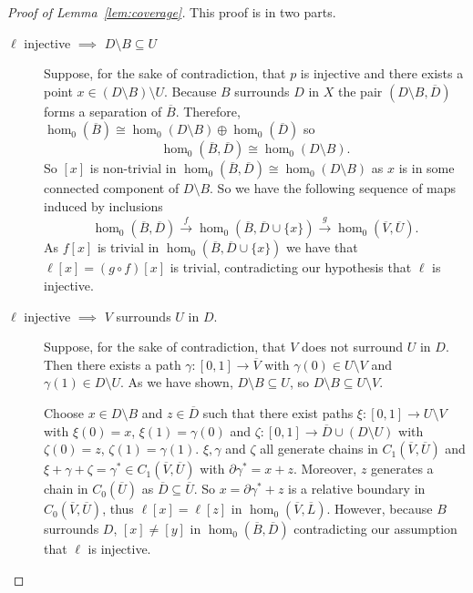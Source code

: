 
\begin{proof}[Proof of Lemma~\ref{lem:coverage}]
  This proof is in two parts.
  \begin{description}
    \item[$\ell$ injective $\implies$ $D\setminus B\subseteq U$] Suppose, for the sake of contradiction, that $p$ is injective and there exists a point $x\in (D\setminus B)\setminus U$.
      Because $B$ surrounds $D$ in $X$ the pair $(D\setminus B, \overline{D})$ forms a separation of $\overline{B}$.
      Therefore, $\hom_0(\overline{B})\cong \hom_0(D\setminus B)\oplus \hom_0(\overline{D})$ so
      \[ \hom_0(\overline{B}, \overline{D})\cong \hom_0(D\setminus B). \]
      So $[x]$ is non-trivial in $\hom_0(\overline{B},\overline{D})\cong \hom_0(D\setminus B)$ as $x$ is in some connected component of $D\setminus B$.
      So we have the following sequence of maps induced by inclusions
      \[ \hom_0(\overline{B},\overline{D})\xrightarrow{f} \hom_0(\overline{B},\overline{D}\cup\{x\})\xrightarrow{g} \hom_0(\overline{V},\overline{U}).\]
      As $f[x]$ is trivial in $\hom_0(\overline{B},\overline{D}\cup\{x\})$ we have that $\ell[x] = (g\circ f)[x]$ is trivial, contradicting our hypothesis that $\ell$ is injective.
    \item[$\ell$ injective $\implies$ $V$ surrounds $U$ in $D$.] Suppose, for the sake of contradiction, that $V$ does not surround $U$ in $D$.
      Then there exists a path $\gamma : [0,1]\to\overline{V}$ with $\gamma(0)\in U\setminus V$ and $\gamma(1)\in D\setminus U$.
      As we have shown, $D\setminus B\subseteq U$, so $D\setminus B\subseteq U\setminus V$.

      Choose $x\in D\setminus B$ and $z\in \overline{D}$ such that there exist paths $\xi : [0,1]\to U\setminus V$ with $\xi(0) = x$, $\xi(1) = \gamma(0)$ and $\zeta : [0,1]\to \overline{D}\cup (D\setminus U)$ with $\zeta(0) = z$, $\zeta(1) = \gamma(1)$.
      $\xi, \gamma$ and $\zeta$ all generate chains in $C_1(\overline{V}, \overline{U})$ and $\xi + \gamma + \zeta = \gamma^*\in C_1(\overline{V}, \overline{U})$ with $\partial\gamma^* = x + z$.
      Moreover, $z$ generates a chain in $C_0(\overline{U})$ as $\overline{D}\subseteq\overline{U}$.
      So $x = \partial\gamma^* + z$ is a relative boundary in $C_0(\overline{V}, \overline{U})$, thus $\ell[x] = \ell[z]$ in $\hom_0(\overline{V}, \overline{L})$.
      However, because $B$ surrounds $D$, $[x]\neq [y]$ in $\hom_0(\overline{B}, \overline{D})$ contradicting our assumption that $\ell$ is injective.
    \end{description}
\end{proof}

